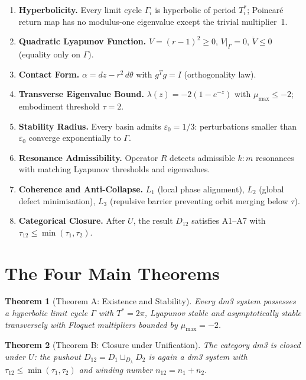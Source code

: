 \documentclass[11pt, twoside, openright]{book}
\theoremstyle{plain}
\newtheorem{theorem}{Theorem}[chapter]
\theoremstyle{definition}
\newcommand{\eps}{\varepsilon_0}
\begin{document}
\begin{enumerate}[label=\textbf{A\arabic*.}, leftmargin=*, itemsep=4pt]
\item \textbf{Hyperbolicity.} Every limit cycle $\Gamma_i$ is
  hyperbolic of period $T_i^*$; Poincaré return map has no modulus-one
  eigenvalue except the trivial multiplier~1.

\item \textbf{Quadratic Lyapunov Function.} $V = (r-1)^2 \ge 0$,
  $V|_\Gamma = 0$, $\dot V \le 0$ (equality only on $\Gamma$).

\item \textbf{Contact Form.} $\alpha = dz - r^2\,d\theta$ with
  $g^T g = I$ (orthogonality law).

\item \textbf{Transverse Eigenvalue Bound.}
  $\lambda(z) = -2(1-e^{-z})$ with $\mu_{\max} \le -2$;
  embodiment threshold $\tau = 2$.

\item \textbf{Stability Radius.}
  Every basin admits $\eps = 1/3$: perturbations smaller than $\eps$
  converge exponentially to $\Gamma$.

\item \textbf{Resonance Admissibility.} Operator $R$ detects admissible
  $k:m$ resonances with matching Lyapunov thresholds and eigenvalues.

\item \textbf{Coherence and Anti-Collapse.} $L_1$ (local phase
  alignment), $L_2$ (global defect minimisation), $L_3$ (repulsive
  barrier preventing orbit merging below $\tau$).

\item \textbf{Categorical Closure.} After $U$, the result $D_{12}$
  satisfies A1--A7 with $\tau_{12} \le \min(\tau_1, \tau_2)$.
\end{enumerate}

\section{The Four Main Theorems}

\begin{theorem}[Theorem A: Existence and Stability]
Every dm3 system possesses a hyperbolic limit cycle $\Gamma$ with
$T^* = 2\pi$, Lyapunov stable and asymptotically stable transversely
with Floquet multipliers bounded by $\mu_{\max} = -2$.
\end{theorem}

\begin{theorem}[Theorem B: Closure under Unification]
The category dm3 is closed under $U$: the pushout
$D_{12} = D_1 \sqcup_{D_\lambda} D_2$ is again a dm3 system with
$\tau_{12} \le \min(\tau_1, \tau_2)$ and winding number
$n_{12} = n_1 + n_2$.
\end{theorem}
\end{document}
